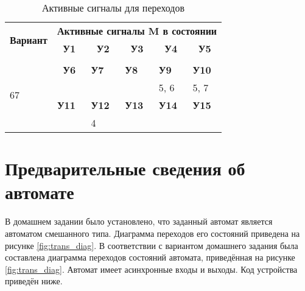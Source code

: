 \documentclass[a4paper, 14pt]{article}
\begin{document}
    \begin{table}[H]
        \caption{Активные сигналы для переходов}
        \begin{tabular}{|l|l|l|l|l|l|}
        \hline
        \multicolumn{1}{|c|}{\multirow{2}{*}{\textbf{Вариант}}} & \multicolumn{5}{c|}{\textbf{Активные сигналы M в состоянии}}                                                                                                                 \\ \cline{2-6} 
        \multicolumn{1}{|c|}{}                                  & \multicolumn{1}{c|}{\textbf{У1}} & \multicolumn{1}{c|}{\textbf{У2}} & \multicolumn{1}{c|}{\textbf{У3}} & \multicolumn{1}{c|}{\textbf{У4}} & \multicolumn{1}{c|}{\textbf{У5}} \\ \hline
        \multirow{5}{*}{67}                                     &                                  &                                  &                                  &                                  &                                  \\ \cline{2-6} 
                                                                & \multicolumn{1}{c|}{\textbf{У6}} & \textbf{У7}                      & \textbf{У8}                      & \textbf{У9}                      & \textbf{У10}                     \\ \cline{2-6} 
                                                                &                                  &                                  &                                  & 5, 6                             & 5, 7                             \\ \cline{2-6} 
                                                                & \textbf{У11}                     & \textbf{У12}                     & \textbf{У13}                     & \textbf{У14}                     & \textbf{У15}                     \\ \cline{2-6} 
                                                                &                                  & 4                                &                                  &                                  &                                  \\ \hline
        \end{tabular}
    \end{table}

    \pagebreak

    \section{Предварительные сведения об автомате}
    В домашнем задании было установлено, что заданный автомат является автоматом смешанного типа. Диаграмма переходов его состояний приведена на рисунке \ref{fig:trans_diag}. 
    В соответствии с вариантом домашнего задания была составлена диаграмма переходов состояний автомата, приведённая на рисунке \ref{fig:trans_diag}.
    Автомат имеет асинхронные входы и выходы. Код устройства приведён ниже.
\end{document}
